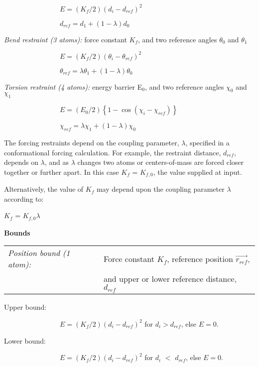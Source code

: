 $\qquad \qquad \qquad \qquad E=\left( K_{f}/2\right) \left(
d_{i}-d_{ref}\right) ^{2}$

$\qquad \qquad \qquad \qquad d_{ref}=d_{1}+\left( 1-\lambda \right) d_{0}$

{\em Bend restraint (3 atoms):} force constant $K_{f}$, and two reference
angles $\theta _{0}$ and $\theta _{1}$

$\qquad \qquad \qquad \qquad E=\left( K_{f}/2\right) \left( \theta
_{i}-\theta _{ref}\right) ^{2}$

$\qquad \qquad \qquad \qquad \theta _{ref}=\lambda \theta _{1}+\left(
1-\lambda \right) \theta _{0}$

{\em Torsion restraint (4 atoms):} energy barrier E$_{0}$, and two reference
angles $\chi _{0}$ and $\chi _{1}$

$\qquad \qquad \qquad \qquad E=\left( E_{0}/2\right) \left\{ 1-\cos \left(
\chi _{i}-\chi _{ref}\right) \right\} $

$\qquad \qquad \qquad \qquad \chi _{ref}=\lambda \chi _{1}+\left( 1-\lambda
\right) \chi _{0}$

The forcing restraints depend on the coupling parameter, $\lambda $,
specified in a conformational forcing calculation. For example, the
restraint distance, $d_{ref}$, depends on $\lambda $, and as $\lambda $
changes two atoms or centers-of-mass are forced closer together or further
apart. In this case $K_{f}$ = $K_{f,0}$, the value supplied at input.

Alternatively, the value of $K_{f}$ may depend upon the coupling parameter $%
\lambda $ according to:

$K_{f}$ = $K_{f,0}$\pagebreak $\lambda $

{\bf Bounds}

\begin{tabular}{ll}
{\em Position bound (1 atom):} & Force constant $K_{f}$, reference position $%
\overrightarrow{r_{ref}}$, \\ 
& and upper or lower reference distance, $d_{ref}$%
\end{tabular}

\qquad Upper bound:

$\qquad \qquad \qquad \qquad E=\left( K_{f}/2\right) \left(
d_{i}-d_{ref}\right) ^{2}$ for $d_{i}>d_{ref}$, else $E=0$.

\qquad Lower bound:

$\qquad \qquad \qquad \qquad E=\left( K_{f}/2\right) \left(
d_{i}-d_{ref}\right) ^{2}$ for $d_{i}$ $<$ $d_{ref}$, else $E=0$.\smallskip


